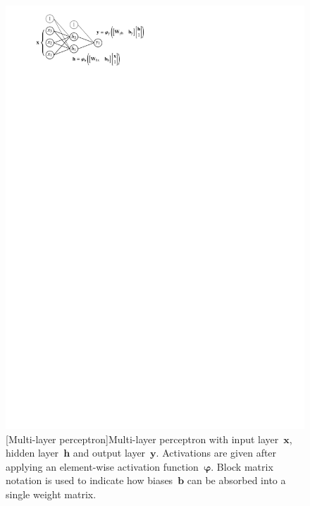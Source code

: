 \begin{figure}[htb]
  \centering
  \begin{minipage}[t]{0.55\textwidth}
    \centering
    \includegraphics{./figures/theory/mlp.pdf}
    [Multi-layer perceptron]{Multi-layer perceptron with
      input layer~$\mathbf{x}$, hidden layer~$\mathbf{h}$ and output
      layer~$\mathbf{y}$. Activations are given after applying an element-wise
      activation function~$\bm{\varphi}$. Block matrix notation is used to
      indicate how biases~$\mathbf{b}$ can be absorbed into a single weight
      matrix.}
    \label{fig:multi_layer_perceptron}
  \end{minipage}\hfill
  \begin{minipage}[t]{0.4\textwidth}
    \centering

\end{minipage}
\end{figure}
